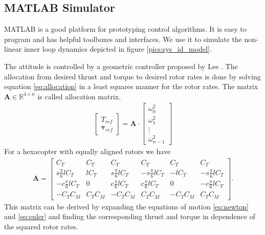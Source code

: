 \subsection{MATLAB Simulator}
\label{sec:matlab_simulator}
MATLAB is a good platform for prototyping control algorithms. It is easy to program and has helpful toolboxes and interfaces. We use it to simulate the non-linear inner loop dynamics depicted in figure \ref{pics:sys_id_model}.

The attitude is controlled by a geometric controller proposed by Lee \cite{Lee2010}. The allocation from desired thrust and torque to desired rotor rates is done by solving equation \ref{eq:allocation} in a least squares manner for the rotor rates. The matrix $\mathbf{A} \in \mathbb{R}^{4\times n}$ is called allocation matrix.
\begin{align}
\begin{bmatrix}
T_{ref} \\ \boldsymbol{\tau}_{ref}
\end{bmatrix} = \mathbf{A} \cdot \begin{bmatrix}
\omega_0^2 \\ \omega_1^2 \\ \vdots \\ \omega_{n-1}^2
\end{bmatrix} \label{eq:allocation} 
\end{align}
For a hexacopter with equally aligned rotors we have
\begin{align}
\mathbf{A} = \begin{bmatrix}
C_T & C_T & C_T & C_T & C_T & C_T \\
s\frac{\pi}{6} l C_T &   l C_T &  s\frac{\pi}{6} l C_T & -s\frac{\pi}{6} l C_T & -l C_T & -s\frac{\pi}{6} l C_T \\
-c\frac{\pi}{6} l C_T &  0 & c\frac{\pi}{6} l C_T &  c\frac{\pi}{6} l C_T &  0 & -c\frac{\pi}{6} l C_T \\
-C_T C_M &  C_T C_M &  -C_T C_M &   C_T C_M & -C_T C_M &  C_T C_M
\end{bmatrix}.
\end{align}
This matrix can be derived by expanding the equations of motion \ref{eq:newton} and \ref{eq:euler} and finding the corresponding thrust and torque in dependence of the squared rotor rates.

